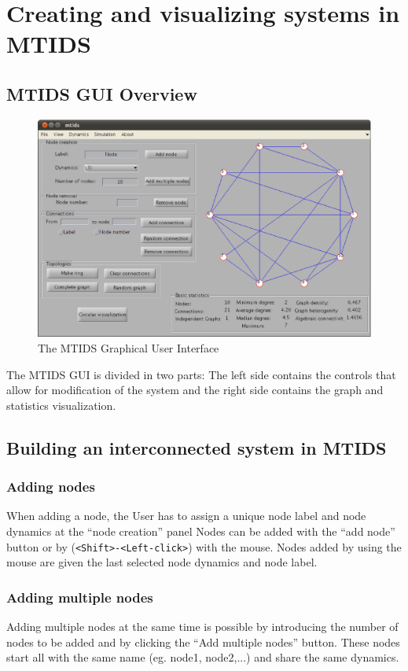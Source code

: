 \documentclass[a4paper,twoside, openright,12pt]{report}
\begin{document}
\section{Creating and visualizing systems in MTIDS}
\subsection{MTIDS GUI Overview}
\begin{figure}[h!]
 \centering
 \includegraphics[width= \textwidth]{./pics/Mtits_UI.eps}
 \caption{The MTIDS Graphical User Interface}
 \label{fig:MTIDS-UI}
\end{figure}
The MTIDS GUI is divided in two parts: The left side contains the controls that allow for modification of the system and the right side contains the graph and statistics visualization.

\subsection{Building an interconnected system in MTIDS}
\subsubsection{Adding nodes}
When adding a node, the User has to assign a unique node label and node dynamics at the ``node creation'' panel
Nodes can be added with the ``add node'' button or by (\verb|<Shift>-<Left-click>|) with the mouse.
Nodes added by using the mouse are given the last selected node dynamics and node label.

\subsubsection{Adding multiple nodes}
Adding multiple nodes at the same time is possible by introducing the number of nodes to be added and by clicking the ``Add multiple nodes'' button.
These nodes start all with the same name (eg. node1, node2,...) and share the same dynamics.
\end{document}
